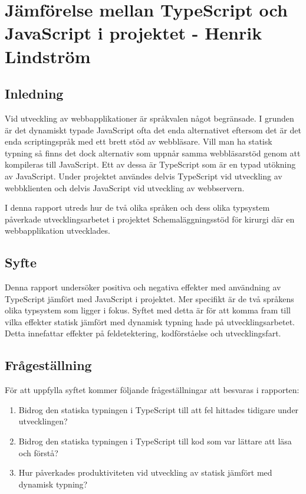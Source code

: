 \chapter{Jämförelse mellan TypeScript och JavaScript i projektet - Henrik Lindström}

\section{Inledning}
Vid utveckling av webbapplikationer är språkvalen något begränsade. I grunden är det dynamiskt typade JavaScript ofta det enda alternativet eftersom det är det enda scriptingspråk med ett brett stöd av webbläsare. Vill man ha statisk typning så finns det dock alternativ som uppnår samma webbläsarstöd genom att kompileras till JavaScript. Ett av dessa är TypeScript som är en typad utökning av JavaScript. Under projektet användes delvis TypeScript vid utveckling av webbklienten och delvis JavaScript vid utveckling av webbservern.

I denna rapport utreds hur de två olika språken och dess olika typsystem påverkade utvecklingsarbetet i projektet Schemaläggningsstöd för kirurgi där en webbapplikation utvecklades.
\section{Syfte}
Denna rapport undersöker positiva och negativa effekter med användning av TypeScript jämfört med JavaScript i projektet. Mer specifikt är de två språkens olika typsystem som ligger i fokus. Syftet med detta är för att komma fram till vilka effekter statisk jämfört med dynamisk typning hade på utvecklingsarbetet. Detta innefattar effekter på feldetektering, kodförståelse och utvecklingsfart. 

\section{Frågeställning}
För att uppfylla syftet kommer följande frågeställningar att besvaras i rapporten:
\begin{enumerate}
\item Bidrog den statiska typningen i TypeScript till att fel hittades tidigare under utvecklingen?
\item Bidrog den statiska typningen i TypeScript till kod som var lättare att läsa och förstå?
\item Hur påverkades produktiviteten vid utveckling av statisk jämfört med dynamisk typning?
\end{enumerate}
